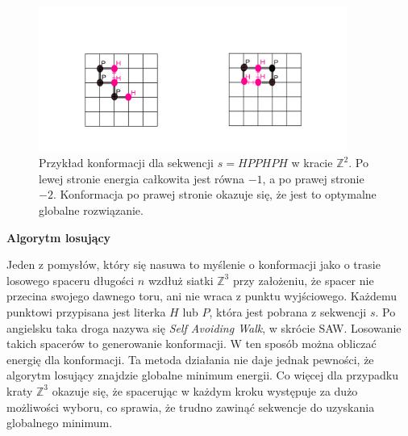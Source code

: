 \documentclass[leqno,10pt]{article}
\begin{document}
\begin{figure}[!htbp]
    \centering
    \includegraphics[width=0.9\textwidth]{diagram.png}
    \caption{Przykład konformacji dla sekwencji $s={HPPHPH}$ w kracie $\mathbb{Z}^{2}$. Po lewej stronie energia całkowita jest równa $-1$, a po prawej stronie $-2$. Konformacja po prawej stronie okazuje się, że jest to optymalne globalne rozwiązanie. }
\end{figure}


\textbf{Algorytm losujący}

Jeden z pomysłów, który się nasuwa to myślenie o konformacji jako o trasie losowego spaceru długości $n$ wzdłuż siatki $\mathbb{Z}^{3}$ przy założeniu, że spacer nie przecina swojego dawnego toru, ani nie wraca z punktu wyjściowego. Każdemu punktowi przypisana jest literka $H$ lub $P$, która jest pobrana z sekwencji $s$. Po angielsku taka droga nazywa się \textit{Self Avoiding Walk}, w skrócie SAW. Losowanie takich spacerów to generowanie konformacji. W ten sposób można obliczać energię dla konformacji. Ta metoda  działania nie daje jednak pewności, że algorytm losujący znajdzie globalne minimum energii. Co więcej dla przypadku kraty $\mathbb{Z}^3$ okazuje się, że spacerując w każdym kroku występuje za dużo możliwości wyboru, co sprawia, że trudno zawinąć sekwencje do uzyskania globalnego minimum. 
\end{document}
